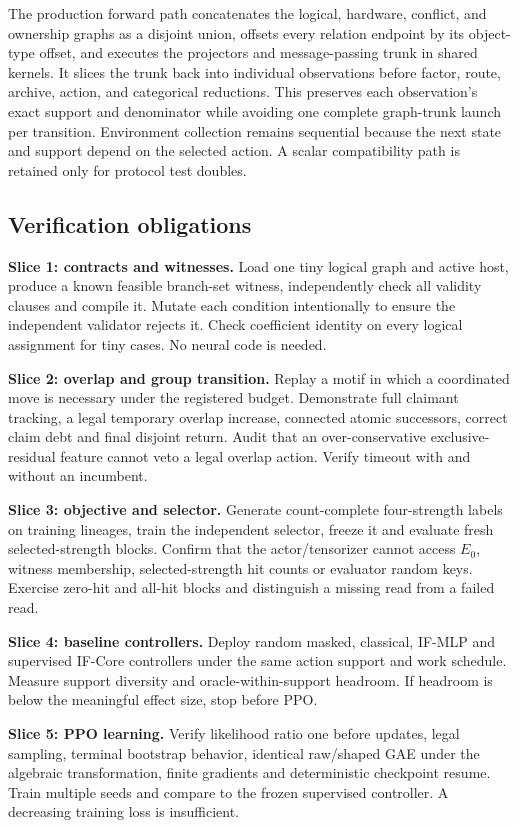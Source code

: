 \documentclass[11pt,a4paper]{article}
\theoremstyle{definition}\newtheorem{definition}[proposition]{Definition}
\begin{document}
The production forward path concatenates the logical, hardware, conflict, and ownership graphs as
a disjoint union, offsets every relation endpoint by its object-type offset, and executes the
projectors and message-passing trunk in shared kernels. It slices the trunk back into individual
observations before factor, route, archive, action, and categorical reductions. This preserves each
observation's exact support and denominator while avoiding one complete graph-trunk launch per
transition. Environment collection remains sequential because the next state and support depend on
the selected action. A scalar compatibility path is retained only for protocol test doubles.

\subsection{Verification obligations}
\textbf{Slice 1: contracts and witnesses.} Load one tiny logical graph and active host, produce a known feasible branch-set witness, independently check all validity clauses and compile it. Mutate each condition intentionally to ensure the independent validator rejects it. Check coefficient identity on every logical assignment for tiny cases. No neural code is needed.

\textbf{Slice 2: overlap and group transition.} Replay a motif in which a coordinated move is necessary under the registered budget. Demonstrate full claimant tracking, a legal temporary overlap increase, connected atomic successors, correct claim debt and final disjoint return. Audit that an over-conservative exclusive-residual feature cannot veto a legal overlap action. Verify timeout with and without an incumbent.

\textbf{Slice 3: objective and selector.} Generate count-complete four-strength labels on training lineages, train the independent selector, freeze it and evaluate fresh selected-strength blocks. Confirm that the actor/tensorizer cannot access $E_0$, witness membership, selected-strength hit counts or evaluator random keys. Exercise zero-hit and all-hit blocks and distinguish a missing read from a failed read.

\textbf{Slice 4: baseline controllers.} Deploy random masked, classical, IF-MLP and supervised IF-Core controllers under the same action support and work schedule. Measure support diversity and oracle-within-support headroom. If headroom is below the meaningful effect size, stop before PPO.

\textbf{Slice 5: PPO learning.} Verify likelihood ratio one before updates, legal sampling, terminal bootstrap behavior, identical raw/shaped GAE under the algebraic transformation, finite gradients and deterministic checkpoint resume. Train multiple seeds and compare to the frozen supervised controller. A decreasing training loss is insufficient.
\end{document}
